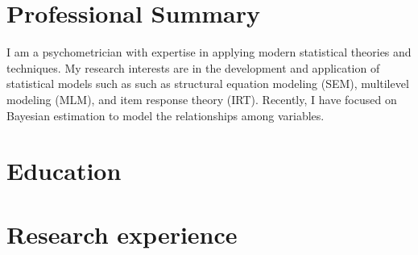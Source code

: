\documentclass[11pt,a4paper,]{awesome-cv}
\begin{document}
\makecvheader






\hypertarget{professional-summary}{%
\section{Professional Summary}\label{professional-summary}}

I am a psychometrician with expertise in applying modern statistical
theories and techniques. My research interests are in the development
and application of statistical models such as such as structural
equation modeling (SEM), multilevel modeling (MLM), and item response
theory (IRT). Recently, I have focused on Bayesian estimation to model
the relationships among variables.

\hypertarget{education}{%
\section{Education}\label{education}}

\begin{cventries}
\end{cventries}

\hypertarget{research-experience}{%
\section{Research experience}\label{research-experience}}
\end{document}
